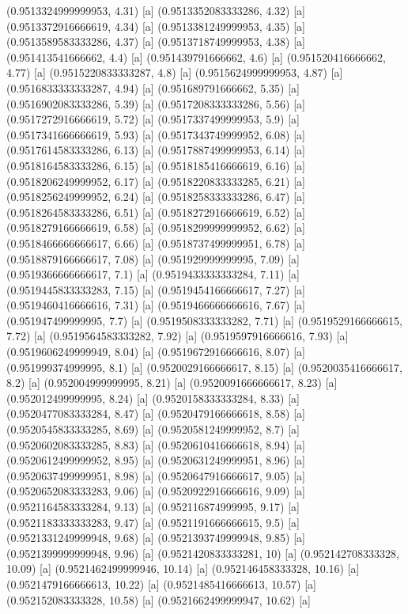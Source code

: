 {{{(0.9513324999999953, 4.31) [a] 
(0.9513352083333286, 4.32) [a] 
(0.9513372916666619, 4.34) [a] 
(0.9513381249999953, 4.35) [a] 
(0.9513589583333286, 4.37) [a] 
(0.9513718749999953, 4.38) [a] 
(0.951413541666662, 4.4) [a] 
(0.951439791666662, 4.6) [a] 
(0.951520416666662, 4.77) [a] 
(0.9515220833333287, 4.8) [a] 
(0.9515624999999953, 4.87) [a] 
(0.9516833333333287, 4.94) [a] 
(0.951689791666662, 5.35) [a] 
(0.9516902083333286, 5.39) [a] 
(0.9517208333333286, 5.56) [a] 
(0.9517272916666619, 5.72) [a] 
(0.9517337499999953, 5.9) [a] 
(0.9517341666666619, 5.93) [a] 
(0.9517343749999952, 6.08) [a] 
(0.9517614583333286, 6.13) [a] 
(0.9517887499999953, 6.14) [a] 
(0.9518164583333286, 6.15) [a] 
(0.9518185416666619, 6.16) [a] 
(0.9518206249999952, 6.17) [a] 
(0.9518220833333285, 6.21) [a] 
(0.9518256249999952, 6.24) [a] 
(0.9518258333333286, 6.47) [a] 
(0.9518264583333286, 6.51) [a] 
(0.9518272916666619, 6.52) [a] 
(0.9518279166666619, 6.58) [a] 
(0.9518299999999952, 6.62) [a] 
(0.9518466666666617, 6.66) [a] 
(0.9518737499999951, 6.78) [a] 
(0.9518879166666617, 7.08) [a] 
(0.951929999999995, 7.09) [a] 
(0.9519366666666617, 7.1) [a] 
(0.9519433333333284, 7.11) [a] 
(0.9519445833333283, 7.15) [a] 
(0.9519454166666617, 7.27) [a] 
(0.9519460416666616, 7.31) [a] 
(0.9519466666666616, 7.67) [a] 
(0.951947499999995, 7.7) [a] 
(0.9519508333333282, 7.71) [a] 
(0.9519529166666615, 7.72) [a] 
(0.9519564583333282, 7.92) [a] 
(0.9519597916666616, 7.93) [a] 
(0.9519606249999949, 8.04) [a] 
(0.9519672916666616, 8.07) [a] 
(0.951999374999995, 8.1) [a] 
(0.9520029166666617, 8.15) [a] 
(0.9520035416666617, 8.2) [a] 
(0.952004999999995, 8.21) [a] 
(0.9520091666666617, 8.23) [a] 
(0.952012499999995, 8.24) [a] 
(0.9520158333333284, 8.33) [a] 
(0.9520477083333284, 8.47) [a] 
(0.9520479166666618, 8.58) [a] 
(0.9520545833333285, 8.69) [a] 
(0.9520581249999952, 8.7) [a] 
(0.9520602083333285, 8.83) [a] 
(0.9520610416666618, 8.94) [a] 
(0.9520612499999952, 8.95) [a] 
(0.9520631249999951, 8.96) [a] 
(0.9520637499999951, 8.98) [a] 
(0.9520647916666617, 9.05) [a] 
(0.9520652083333283, 9.06) [a] 
(0.9520922916666616, 9.09) [a] 
(0.9521164583333284, 9.13) [a] 
(0.952116874999995, 9.17) [a] 
(0.9521183333333283, 9.47) [a] 
(0.9521191666666615, 9.5) [a] 
(0.9521331249999948, 9.68) [a] 
(0.9521393749999948, 9.85) [a] 
(0.9521399999999948, 9.96) [a] 
(0.9521420833333281, 10) [a] 
(0.952142708333328, 10.09) [a] 
(0.9521462499999946, 10.14) [a] 
(0.952146458333328, 10.16) [a] 
(0.9521479166666613, 10.22) [a] 
(0.9521485416666613, 10.57) [a] 
(0.952152083333328, 10.58) [a] 
(0.9521662499999947, 10.62) [a] 
}}}
